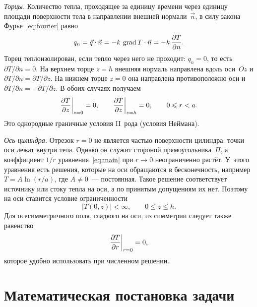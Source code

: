 \emph{Торцы.} Количество тепла, проходящее за единицу времени через
единицу площади поверхности тела в направлении внешней нормали~$\vec n$,
в силу закона Фурье~\eqref{eq:fourier} равно
\begin{equation}
\label{eq:flux-n}
q_n=\vec q\cdot\vec n=-k\,\operatorname{grad} T\cdot\vec n=-k\,\dfrac{\partial T}{\partial n} .
\end{equation}
Торец теплоизолирован, если тепло через него не проходит: $q_n=0$, то есть
$\partial T/\partial n=0$. На верхнем торце $z=h$ внешняя нормаль направлена
вдоль оси~$Oz$ и $\partial T/\partial n=\partial T/\partial z$. На нижнем
торце $z=0$ она направлена противоположно оси и
$\partial T/\partial n=-\partial T/\partial z$. В обоих случаях получаем
\begin{equation}
\label{eq:bc-ends}
\dfrac{\partial T}{\partial z}\bigg|_{z=0}=0,\qquad \dfrac{\partial T}{\partial z}\bigg|_{z=h}=0,\qquad 0\leqslant r<a .
\end{equation}
Это однородные граничные условия II~рода (условия Неймана).

\emph{Ось цилиндра.} Отрезок $r=0$ не является частью поверхности
цилиндра: точки оси лежат внутри тела. Однако он служит стороной
прямоугольника~$\Pi$, а коэффициент $1/r$ уравнения~\eqref{eq:main} при
$r\to 0$ неограниченно растёт. У~этого уравнения есть решения, которые на
оси обращаются в бесконечность, например $T=A\ln(r/a)$, где $A\ne 0$~—
постоянная. Такое решение соответствует источнику или стоку тепла на оси,
а по принятым допущениям их нет. Поэтому на оси ставится условие
ограниченности
\begin{equation}
\label{eq:bc-axis}
\bigl|T(0,z)\bigr|<\infty,\qquad 0\le z\le h .
\end{equation}
Для осесимметричного поля, гладкого на оси, из симметрии следует также
равенство
\begin{equation}
\label{eq:bc-axis-n}
\dfrac{\partial T}{\partial r}\bigg|_{r=0}=0,
\end{equation}
которое удобно использовать при численном решении.

\section{Математическая постановка задачи}
\label{sec:statement}

